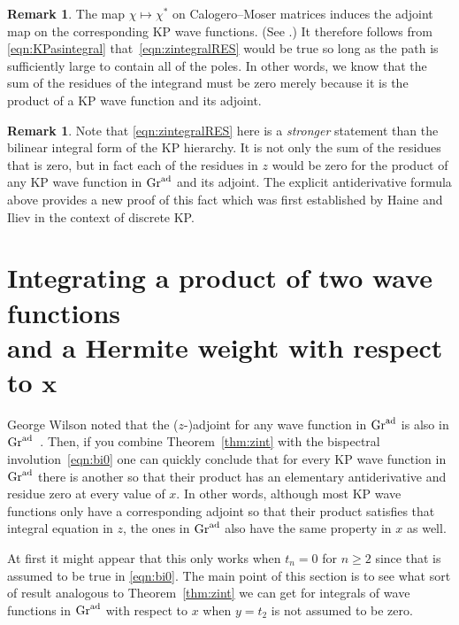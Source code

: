 \documentclass[pdftex]{sigma}
\numberwithin{equation}{section}
\theoremstyle{definition}
\newtheorem{Remark}[Theorem]{Remark}
\begin{document}
\begin{Remark}
The map $\chi\mapsto \chi^*$ on Calogero--Moser matrices induces the
adjoint map on the corresponding KP wave functions. (See \cite[Lemma 7.7]{WilsonCM}.)
It therefore follows from
\eqref{eqn:KPasintegral} that~\eqref{eqn:zintegralRES} would be true so long as the path is
sufficiently large to contain all of the poles. In other words,
we know that the sum of the residues of
the integrand must be zero merely because it is the product of a KP
wave function and its adjoint.
\end{Remark}
\begin{Remark}
Note that \eqref{eqn:zintegralRES} here is a \textit{stronger} statement
than the bilinear integral form of the KP hierarchy.
It is not only the sum of the residues that is zero, but in fact each
of the
residues in $z$ would be zero for the product of any KP wave function
in ${\rm Gr}^{\rm ad}$ and its adjoint.
The explicit antiderivative formula above provides a new proof of this fact which was first established
by Haine and Iliev \cite{HaineIliev} in the context of discrete KP.
\end{Remark}

\section[Integrating a product of two wave functions and a Hermite weight with respect to x]{Integrating a product of two wave functions\\ and a Hermite weight with respect to $ \boldsymbol{x}$}\label{sec:intx}

George Wilson noted that the ($z$-)adjoint for any wave function in
${\rm Gr}^{\rm ad}$ is also in ${\rm Gr}^{\rm ad}$~\cite{WilsonBisp}.
Then, if you combine Theorem~\ref{thm:zint}
with the bispectral involution~\eqref{eqn:bi0}
one can quickly conclude that for every KP wave function in ${\rm Gr}^{\rm ad}$ there is
another so that their product has an elementary antiderivative and
residue zero at every value of $x$. In other words, although most KP
wave functions only have a corresponding adjoint so that their product
satisfies that integral equation in $z$, the ones in ${\rm Gr}^{\rm ad}$ also have the same
property in $x$ as well.

At first it might
appear that this only works when $t_n=0$
for $n\geq 2$ since that is assumed to be true in \eqref{eqn:bi0}. The main point of this section is to see what sort of
result analogous to Theorem~\ref{thm:zint} we can get for integrals of
wave functions in ${\rm Gr}^{\rm ad}$ with respect to $x$ when $y=t_2$ is not
assumed to be zero.
\end{document}
